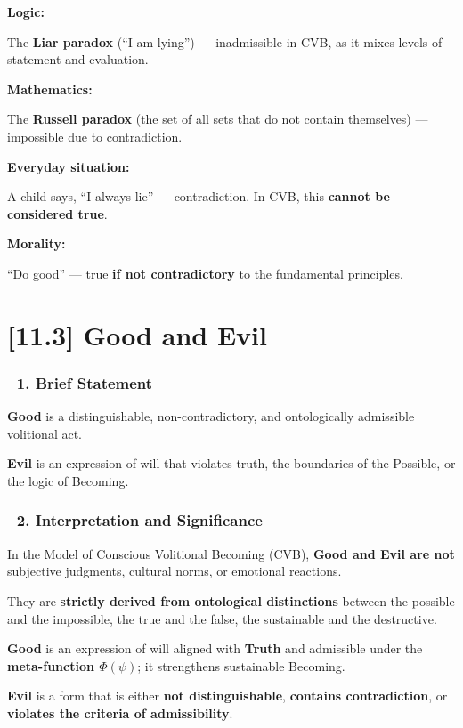 \documentclass[12pt]{article}
\begin{document}
\textbf{Logic:}

The \textbf{Liar paradox} (``I am lying'') — inadmissible in CVB, as it mixes levels of statement and evaluation.

\textbf{Mathematics:}

The \textbf{Russell paradox} (the set of all sets that do not contain themselves) — impossible due to contradiction.

\textbf{Everyday situation:}

A child says, ``I always lie'' — contradiction. In CVB, this \textbf{cannot be considered true}.

\textbf{Morality:}

``Do good'' — true \textbf{if not contradictory} to the fundamental principles.

\section*{[11.3] Good and Evil}

\subsubsection*{🔹 1. Brief Statement}

\textbf{Good} is a distinguishable, non-contradictory, and ontologically admissible volitional act.

\textbf{Evil} is an expression of will that violates truth, the boundaries of the Possible, or the logic of Becoming.

\subsubsection*{🔹 2. Interpretation and Significance}

In the Model of Conscious Volitional Becoming (CVB), \textbf{Good and Evil are not} subjective judgments, cultural norms, or emotional reactions.

They are \textbf{strictly derived from ontological distinctions} between the possible and the impossible, the true and the false, the sustainable and the destructive.

\textbf{Good} is an expression of will aligned with \textbf{Truth} and admissible under the \textbf{meta-function $\Phi(\psi)$}; it strengthens sustainable Becoming.

\textbf{Evil} is a form that is either \textbf{not distinguishable}, \textbf{contains contradiction}, or \textbf{violates the criteria of admissibility}.
\end{document}
